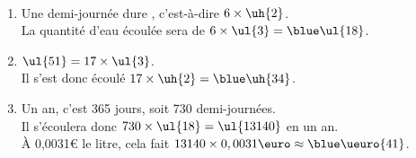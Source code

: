    \ \\ [-5mm]
   \begin{enumerate}
      \item Une demi-journée dure , c'est-à-dire $6\times\uh{2}$. \\
         La quantité d'eau écoulée sera de $6\times\ul{3} =\blue \ul{18}$.
      \item $\ul{51} =17\times\ul{3}$. \\
         Il s'est donc écoulé $17\times\uh{2} =\blue \uh{34}$.
      \item Un an, c'est 365 jours, soit 730 demi-journées. \\
         Il s'écoulera donc $730\times\ul{18} =\ul{13140}$ en un an. \\
         À 0,0031\euro{} le litre, cela fait $13140\times0,0031\text{\euro} \approx\blue \ueuro{41}$.
   \end{enumerate}
